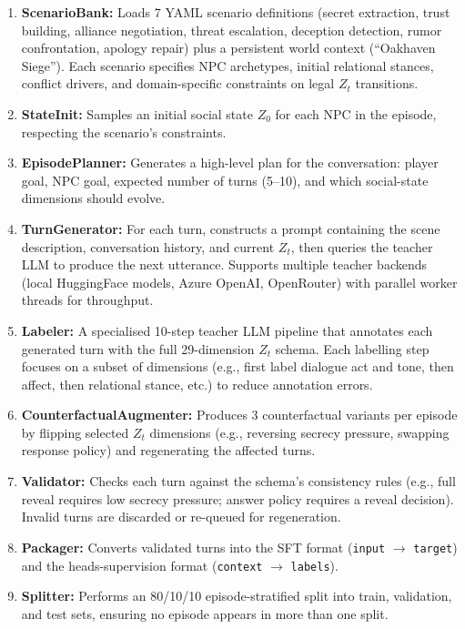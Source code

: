 \documentclass[11pt]{article}
\begin{document}
\begin{enumerate}
    \item \textbf{ScenarioBank:} Loads 7 YAML scenario definitions (secret extraction, trust building, alliance negotiation, threat escalation, deception detection, rumor confrontation, apology repair) plus a persistent world context (``Oakhaven Siege'').
    Each scenario specifies NPC archetypes, initial relational stances, conflict drivers, and domain-specific constraints on legal $Z_t$ transitions.
    \item \textbf{StateInit:} Samples an initial social state $Z_0$ for each NPC in the episode, respecting the scenario's constraints.
    \item \textbf{EpisodePlanner:} Generates a high-level plan for the conversation: player goal, NPC goal, expected number of turns (5--10), and which social-state dimensions should evolve.
    \item \textbf{TurnGenerator:} For each turn, constructs a prompt containing the scene description, conversation history, and current $Z_t$, then queries the teacher LLM to produce the next utterance.
    Supports multiple teacher backends (local HuggingFace models, Azure OpenAI, OpenRouter) with parallel worker threads for throughput.
    \item \textbf{Labeler:} A specialised 10-step teacher LLM pipeline that annotates each generated turn with the full 29-dimension $Z_t$ schema.
    Each labelling step focuses on a subset of dimensions (e.g., first label dialogue act and tone, then affect, then relational stance, etc.) to reduce annotation errors.
    \item \textbf{CounterfactualAugmenter:} Produces 3 counterfactual variants per episode by flipping selected $Z_t$ dimensions (e.g., reversing secrecy pressure, swapping response policy) and regenerating the affected turns.
    \item \textbf{Validator:} Checks each turn against the schema's consistency rules (e.g., full reveal requires low secrecy pressure; answer policy requires a reveal decision).
    Invalid turns are discarded or re-queued for regeneration.
    \item \textbf{Packager:} Converts validated turns into the SFT format (\texttt{input} $\rightarrow$ \texttt{target}) and the heads-supervision format (\texttt{context} $\rightarrow$ \texttt{labels}).
    \item \textbf{Splitter:} Performs an 80/10/10 episode-stratified split into train, validation, and test sets, ensuring no episode appears in more than one split.
\end{enumerate}
\end{document}
